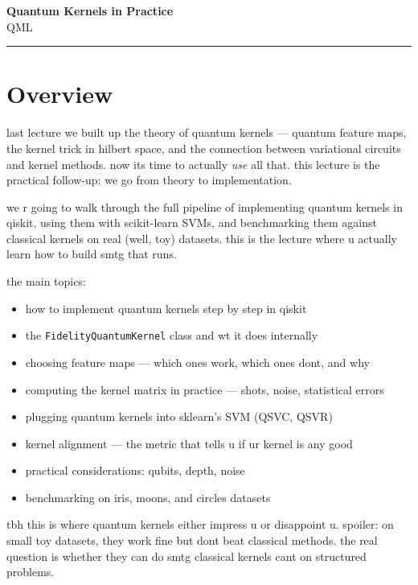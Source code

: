 \documentclass[11pt,a4paper]{article}
\theoremstyle{definition}
\theoremstyle{remark}
\begin{document}
\begin{center}
    {\LARGE \textbf{Quantum Kernels in Practice}}\\[8pt]
    {\large QML}\\[12pt]
    \hrule
\end{center}

\vspace{12pt}
\tableofcontents
\newpage

\section{Overview}

last lecture we built up the theory of quantum kernels --- quantum feature maps, the kernel trick in hilbert space, and the connection between variational circuits and kernel methods. now its time to actually \emph{use} all that. this lecture is the practical follow-up: we go from theory to implementation.

we r going to walk through the full pipeline of implementing quantum kernels in qiskit, using them with scikit-learn SVMs, and benchmarking them against classical kernels on real (well, toy) datasets. this is the lecture where u actually learn how to build smtg that runs.

the main topics:
\begin{itemize}[leftmargin=*]
    \item how to implement quantum kernels step by step in qiskit
    \item the \texttt{FidelityQuantumKernel} class and wt it does internally
    \item choosing feature maps --- which ones work, which ones dont, and why
    \item computing the kernel matrix in practice --- shots, noise, statistical errors
    \item plugging quantum kernels into sklearn's SVM (QSVC, QSVR)
    \item kernel alignment --- the metric that tells u if ur kernel is any good
    \item practical considerations: qubits, depth, noise
    \item benchmarking on iris, moons, and circles datasets
\end{itemize}

tbh this is where quantum kernels either impress u or disappoint u. spoiler: on small toy datasets, they work fine but dont beat classical methods. the real question is whether they can do smtg classical kernels cant on structured problems.
\end{document}
